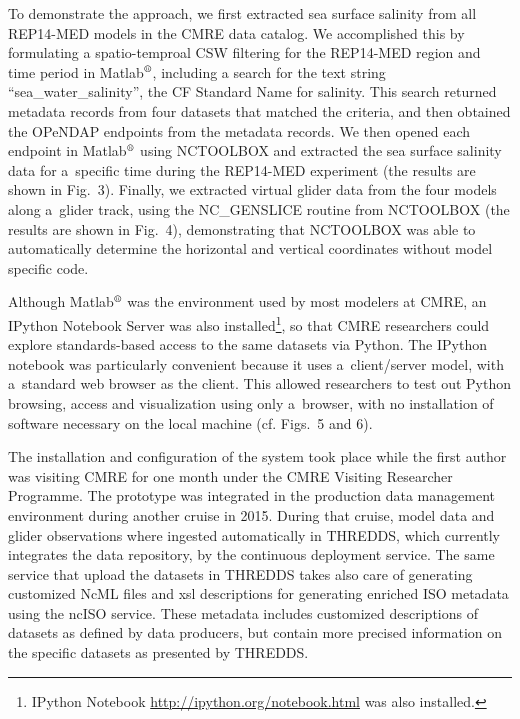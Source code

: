 \documentclass[osd, online, hvmath]{copernicus}
\begin{document}
To demonstrate the approach, we first extracted sea surface salinity from all REP14-MED models in the CMRE data catalog. We accomplished this by 
formulating a spatio-temproal CSW filtering for the REP14-MED region and time period in Matlab$^{\text{\textregistered}}$, including a search for the text
string ``sea\_water\_salinity'', the CF Standard Name for salinity. This search returned metadata records from four datasets that matched the criteria, and then obtained the OPeNDAP endpoints from the metadata records. 
We then opened each endpoint in Matlab$^{\text{\textregistered}}$ using NCTOOLBOX and extracted the sea surface salinity data for a~specific time during the REP14-MED
experiment (the results are shown in Fig.~3). Finally, we extracted virtual glider data from the four models along a~glider track, using
the NC\_GENSLICE routine from NCTOOLBOX (the results are shown in Fig.~4), demonstrating that NCTOOLBOX was able to automatically
determine the horizontal and vertical coordinates without model specific code.

Although Matlab$^{\text{\textregistered}}$ was the environment used by
most modelers at CMRE, an IPython Notebook Server was also installed\footnote{IPython
  Notebook \url{http://ipython.org/notebook.html} was also
  installed.}, so that CMRE researchers could explore standards-based
access to the same datasets via Python. The IPython notebook was
particularly convenient because it uses a~client/server model, with
a~standard web browser as the client. This allowed researchers to test
out Python browsing, access and visualization using only a~browser,
with no installation of software necessary on the local machine
(cf. Figs.~5 and 6). %

The installation and configuration of the system took place while the first author was visiting CMRE for one month under the CMRE Visiting
Researcher Programme. The prototype was integrated in the production data management environment during another cruise in 2015. During that cruise, model data and glider observations where ingested automatically in THREDDS, which currently integrates the data repository, by the continuous deployment service. The same service that upload the datasets in THREDDS takes also care of generating customized NcML files and xsl descriptions for generating enriched ISO metadata using the ncISO service. These metadata includes customized descriptions of datasets as defined by data producers, but contain more precised information on the specific datasets as presented by THREDDS. 
\end{document}
